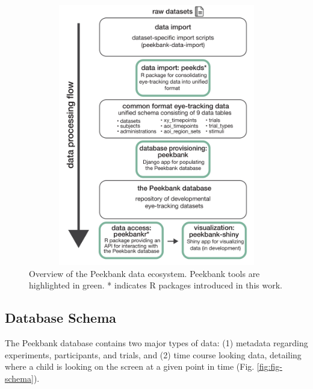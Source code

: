 \documentclass[
  english,
  man,floatsintext]{apa6}
\providecommand{\DIFaddendFL}{} %
\providecommand{\DIFdelbeginFL}{} %
\providecommand{\DIFdelendFL}{} %
\newcommand{\DIFscaledelfig}{0.5}
\newlength{\DIFdelgraphicswidth} %
\newlength{\DIFdelgraphicsheight} %
\newcommand{\DIFdelincludegraphics}[2][]{%
\sbox{\DIFdelgraphicsbox}{\DIFOincludegraphics[#1]{#2}}%
\settoboxwidth{\DIFdelgraphicswidth}{\DIFdelgraphicsbox} %
\settoboxtotalheight{\DIFdelgraphicsheight}{\DIFdelgraphicsbox} %
\scalebox{\DIFscaledelfig}{%
\parbox[b]{\DIFdelgraphicswidth}{\usebox{\DIFdelgraphicsbox}\\[-\baselineskip] \rule{\DIFdelgraphicswidth}{0em}}\llap{\resizebox{\DIFdelgraphicswidth}{\DIFdelgraphicsheight}{%
\setlength{\unitlength}{\DIFdelgraphicswidth}%
\begin{picture}(1,1)%
\thicklines\linethickness{2pt} %
{\color[rgb]{1,0,0}\put(0,0){\framebox(1,1){}}}%
{\color[rgb]{1,0,0}\put(0,0){\line( 1,1){1}}}%
{\color[rgb]{1,0,0}\put(0,1){\line(1,-1){1}}}%
\end{picture}%
}\hspace*{3pt}}} %
} %
\DeclareRobustCommand{\DIFaddendFL}{\DIFOaddendFL \let\includegraphics\DIFOincludegraphics} %
\DeclareRobustCommand{\DIFdelbeginFL}{\DIFOdelbeginFL \let\includegraphics\DIFdelincludegraphics} %
\DeclareRobustCommand{\DIFdelendFL}{\DIFOaddendFL \let\includegraphics\DIFOincludegraphics} %
\begin{document}
\begin{figure}

{\centering \DIFdelbeginFL %
\DIFdelendFL \includegraphics[width=18in,height=4.5in]{brm/figures/peekbankflowchartv6.pdf} 
\DIFaddendFL 

}

\caption{Overview of the Peekbank data ecosystem. Peekbank tools are highlighted in green. * indicates R packages introduced in this work.}\label{fig:fig-framework-overview}
\end{figure}

\hypertarget{database-schema}{%
\subsection{Database Schema}\label{database-schema}}

The Peekbank database contains two major types of data: (1) metadata regarding experiments, participants, and trials, and (2) time course looking data, detailing where a child is looking on the screen at a given point in time (Fig. \ref{fig:fig-schema}).
\end{document}
